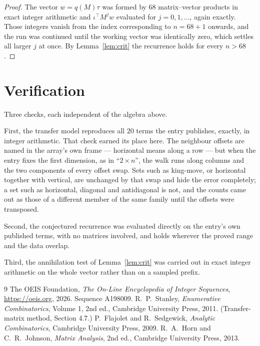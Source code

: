 \documentclass[11pt,a4paper]{article}
\theoremstyle{plain}
\theoremstyle{definition}
\begin{document}
\begin{proof}
The vector $w=q(M)\tau$ was formed by $68$ matrix--vector products in exact integer
arithmetic and $\iota^{\!\top}M^{j}w$ evaluated for $j=0,1,\dots$, again exactly. Those
integers vanish from the index corresponding to $n=68+1$ onwards, and the run was
continued until the working vector was identically zero, which settles all larger $j$ at once.
By Lemma~\ref{lem:crit} the recurrence holds for every $n>68$.
\end{proof}

\section{Verification}

Three checks, each independent of the algebra above.

First, the transfer model reproduces all $20$ terms the entry publishes, exactly, in
integer arithmetic. That check earned its place here. The neighbour offsets are named in the
array's own frame --- horizontal means along a row --- but when the entry fixes the first
dimension, as in ``$2\times n$'', the walk runs along columns and the two components of every
offset swap. Sets such as king-move, or horizontal together with vertical, are unchanged by
that swap and hide the error completely; a set such as horizontal, diagonal and antidiagonal
is not, and the counts came out as those of a different member of the same family until the
offsets were transposed.

Second, the conjectured recurrence was evaluated directly on the entry's own published terms,
with no matrices involved, and holds wherever the proved range and the data overlap.

Third, the annihilation test of Lemma~\ref{lem:crit} was carried out in exact integer
arithmetic on the whole vector rather than on a sampled prefix.

\begin{thebibliography}{9}
 The OEIS Foundation, \emph{The On-Line Encyclopedia of Integer
Sequences}, \url{https://oeis.org}, 2026. Sequence A198009.
 R.~P.~Stanley, \emph{Enumerative Combinatorics}, Volume 1, 2nd ed.,
Cambridge University Press, 2011. (Transfer-matrix method, Section 4.7.)
 P.~Flajolet and R.~Sedgewick, \emph{Analytic Combinatorics}, Cambridge
University Press, 2009.
 R.~A.~Horn and C.~R.~Johnson, \emph{Matrix Analysis}, 2nd ed., Cambridge
University Press, 2013.
\end{thebibliography}
\end{document}
